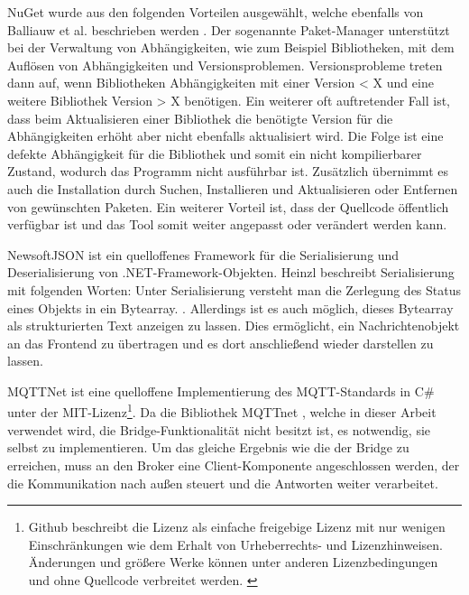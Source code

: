     
    NuGet wurde aus den folgenden Vorteilen ausgewählt, welche ebenfalls von Balliauw et al. beschrieben werden \cite{balliauw2012pro}.
    Der sogenannte Paket-Manager unterstützt bei der Verwaltung von Abhängigkeiten, wie zum Beispiel Bibliotheken, mit dem Auflösen von Abhängigkeiten und Versionsproblemen. Versionsprobleme treten dann auf, wenn Bibliotheken Abhängigkeiten mit einer Version < X und eine weitere Bibliothek Version > X benötigen. Ein weiterer oft auftretender Fall ist, dass beim Aktualisieren einer Bibliothek die benötigte Version für die Abhängigkeiten erhöht aber nicht ebenfalls aktualisiert wird. Die Folge ist eine defekte Abhängigkeit für die Bibliothek und somit ein nicht kompilierbarer Zustand, wodurch das Programm nicht ausführbar ist. Zusätzlich übernimmt es auch die Installation durch Suchen, Installieren und Aktualisieren oder Entfernen von gewünschten Paketen. Ein weiterer Vorteil ist, dass der Quellcode öffentlich verfügbar ist und das Tool somit weiter angepasst oder verändert werden kann.
    
    NewsoftJSON \cite{newton_king_2013} ist ein quelloffenes Framework für die Serialisierung und Deserialisierung von .NET-Framework-Objekten.
    Heinzl beschreibt Serialisierung mit folgenden Worten: \glqq Unter Serialisierung versteht man die Zerlegung des Status eines Objekts in ein Bytearray.\grqq{} \cite{Heinzl2005}. Allerdings ist es auch möglich, dieses Bytearray als strukturierten Text anzeigen zu lassen.
    Dies ermöglicht, ein Nachrichtenobjekt an das Frontend zu übertragen und es dort anschließend wieder darstellen zu lassen.
    
    MQTTNet ist eine quelloffene Implementierung des \ac{MQTT}-Standards in C\# unter der MIT-Lizenz\footnote{
    Github beschreibt die Lizenz als einfache freigebige Lizenz mit nur wenigen Einschränkungen wie dem Erhalt von Urheberrechts- und Lizenzhinweisen. Änderungen und größere Werke können unter anderen Lizenzbedingungen und ohne Quellcode verbreitet werden. \cite{github_inc_2019}}.
    Da die Bibliothek MQTTnet \cite{chkr1011_2018},
    welche in dieser Arbeit verwendet wird, die Bridge-Funktionalität nicht besitzt ist, es notwendig, sie selbst zu implementieren. Um das gleiche Ergebnis wie die der Bridge zu erreichen, muss an den Broker eine Client-Komponente angeschlossen werden, der die Kommunikation nach außen steuert und die Antworten weiter verarbeitet. 
    
